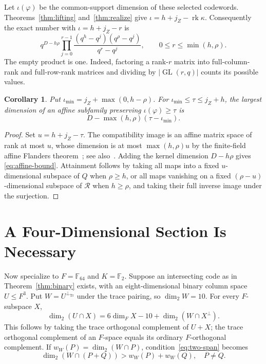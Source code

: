 \documentclass[12pt,letterpaper,onecolumn]{article}
\newcommand{\F}{\mathbb F}
\newcommand{\GL}{\operatorname{GL}}
\newcommand{\Tr}{\operatorname{Tr}}
\newcommand{\perptr}{\perp_{\Tr}}
\newtheorem{corollary}[theorem]{Corollary}
\theoremstyle{definition}
\begin{document}
Let $\iota(\varphi)$ be the common-support dimension of these selected codewords. Theorems~\ref{thm:lifting} and~\ref{thm:realize} give $\iota=h+j_Z-\operatorname{rk}\kappa$. Consequently the exact number with $\iota=h+j_Z-r$ is
\begin{equation}
 q^{D-h\rho}\prod_{j=0}^{r-1}
 \frac{(q^h-q^j)(q^\rho-q^j)}{q^r-q^j},
 \qquad 0\le r\le\min(h,\rho).
 \label{eq:distribution}
\end{equation}
The empty product is one. Indeed, factoring a rank-$r$ matrix into full-column-rank and full-row-rank matrices and dividing by $|\GL(r,q)|$ counts its possible values.

\begin{corollary}\label{cor:affine}
Put $\iota_{\min}=j_Z+\max(0,h-\rho)$. For $\iota_{\min}\le\tau\le j_Z+h$, the largest dimension of an affine subfamily preserving $\iota(\varphi)\ge\tau$ is
\begin{equation}
 D-\max(h,\rho)(\tau-\iota_{\min}).
 \label{eq:affine-bound}
\end{equation}
\end{corollary}
\begin{proof}
Set $u=h+j_Z-\tau$. The compatibility image is an affine matrix space of rank at most $u$, whose dimension is at most $\max(h,\rho)u$ by the finite-field affine Flanders theorem~\cite[Theorem 2]{deSeguinsPazzis2016Flanders}; see also~\cite{flanders1962}. Adding the kernel dimension $D-h\rho$ gives \eqref{eq:affine-bound}. Attainment follows by taking all maps into a fixed $u$-dimensional subspace of $Q$ when $\rho\ge h$, or all maps vanishing on a fixed $(\rho-u)$-dimensional subspace of $\mathcal R$ when $h\ge\rho$, and taking their full inverse image under the surjection.
\end{proof}

\section{A Four-Dimensional Section Is Necessary}
Now specialize to $F=\F_{64}$ and $K=\F_2$. Suppose an intersecting code as in Theorem~\ref{thm:binary} exists, with an eight-dimensional binary column space $U\le F^3$. Put $W=U^{\perptr}$ under the trace pairing, so $\dim_2W=10$. For every $F$-subspace $X$,
\begin{equation}
 \dim_2(U\cap X)=6\dim_FX-10+\dim_2(W\cap X^\perp).
 \label{eq:trace}
\end{equation}
This follows by taking the trace orthogonal complement of $U+X$; the trace orthogonal complement of an $F$-space equals its ordinary $F$-orthogonal complement. If $w_W(P)=\dim_2(W\cap P)$, condition~\eqref{eq:two-span} becomes
\begin{equation}
 \dim_2(W\cap(P+Q))>w_W(P)+w_W(Q),\quad P\ne Q.
 \label{eq:strictdual}
\end{equation}
\end{document}
